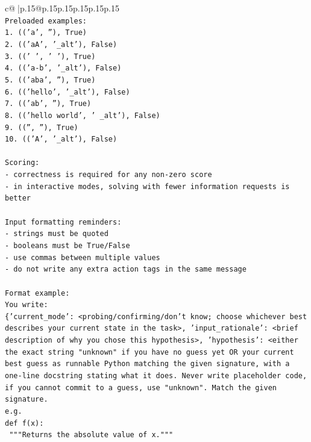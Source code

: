 \documentclass{article}
\begin{document}
{\begin{supertabular}{c@{$\;$}|p{.15\linewidth}@{}p{.15\linewidth}p{.15\linewidth}p{.15\linewidth}p{.15\linewidth}p{.15\linewidth}}
{{{\\ 
\texttt{Preloaded examples:} \\
\texttt{1. (('a', ''), True)} \\
\texttt{2. (('aA', '\_alt'), False)} \\
\texttt{3. (('   ', '   '), True)} \\
\texttt{4. (('a{-}b', '\_alt'), False)} \\
\texttt{5. (('aba', ''), True)} \\
\texttt{6. (('hello', '\_alt'), False)} \\
\texttt{7. (('ab', ''), True)} \\
\texttt{8. (('hello world', ' \_alt'), False)} \\
\texttt{9. (('', ''), True)} \\
\texttt{10. (('A', '\_alt'), False)} \\
\\ 
\texttt{Scoring:} \\
\texttt{{-} correctness is required for any non{-}zero score} \\
\texttt{{-} in interactive modes, solving with fewer information requests is better} \\
\\ 
\texttt{Input formatting reminders:} \\
\texttt{{-} strings must be quoted} \\
\texttt{{-} booleans must be True/False} \\
\texttt{{-} use commas between multiple values} \\
\texttt{{-} do not write any extra action tags in the same message} \\
\\ 
\texttt{Format example:} \\
\texttt{You write:} \\
\texttt{\{'current\_mode': <probing/confirming/don't know; choose whichever best describes your current state in the task>, 'input\_rationale': <brief description of why you chose this hypothesis>, 'hypothesis': <either the exact string "unknown" if you have no guess yet OR your current best guess as runnable Python matching the given signature, with a one{-}line docstring stating what it does. Never write placeholder code, if you cannot commit to a guess, use "unknown". Match the given signature.} \\
\texttt{e.g.} \\
\texttt{def f(x):} \\
\texttt{	"""Returns the absolute value of x."""} \\
}}}
\end{supertabular}}
\end{document}
